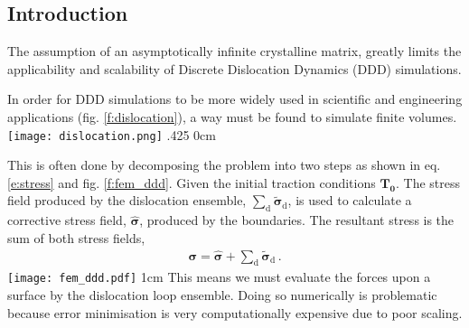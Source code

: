 \begin{multicols}{2}
	{\fontsize{37}{44.4}\selectfont
		\section{Introduction}
		The assumption of an asymptotically infinite crystalline matrix, greatly limits the applicability and scalability of Discrete Dislocation Dynamics (DDD) simulations.

		In order for DDD simulations to be more widely used in scientific and engineering applications (fig. \ref{f:dislocation}), a way must be found to simulate finite volumes.
		{%
			\texttt{[image: dislocation.png]}
		}{\quad}{.425\linewidth}
		{%
			\label{f:dislocation}
		}{0cm}

		This is often done by decomposing the problem into two steps as shown in eq. \ref{e:stress} and fig. \ref{f:fem_ddd}. Given the initial traction conditions $ \bm{T_{0}} $. The stress field produced by the dislocation ensemble, $ \sum_{\textrm{d}} \bm{\tilde{\sigma}}_{\textrm{d}} $, is used to calculate a corrective stress field, $ \bm{\hat{\sigma}} $, produced by the boundaries. The resultant stress is the sum of both stress fields,
		\begin{align}
			\bm{\sigma} = \bm{\hat{\sigma}} + \sum\limits_{\textrm{d}} \bm{\tilde{\sigma}}_{\textrm{d}}\,.\label{e:stress}
		\end{align}
		{%
			\texttt{[image: fem\_ddd.pdf]}%
			\label{f:fem_ddd}
		}{1cm}
		This means we must evaluate the forces upon a surface by the dislocation loop ensemble. Doing so numerically is problematic because error minimisation is very computationally expensive due to poor scaling.

}
\end{multicols}
